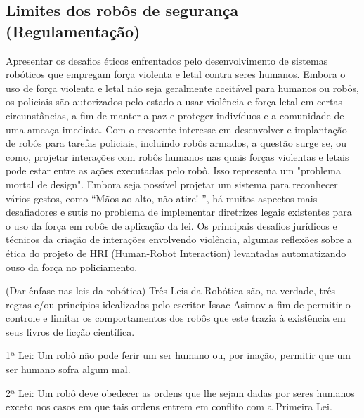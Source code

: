 \documentclass[12pt,a4paper]{article}
\begin{document}

    \subsection{Limites dos robôs de segurança (Regulamentação)}
    Apresentar os desafios éticos enfrentados pelo desenvolvimento de sistemas robóticos que empregam força violenta e letal contra seres humanos. Embora o uso de força violenta e letal não seja geralmente aceitável para humanos ou robôs, os policiais são autorizados pelo estado a usar violência e força letal em certas circunstâncias, a fim de manter a paz e proteger indivíduos e a comunidade de uma ameaça imediata. Com o crescente interesse em desenvolver e implantação de robôs para tarefas policiais, incluindo robôs armados, a questão surge se, ou como, projetar interações com robôs humanos nas quais forças violentas e letais pode estar entre as ações executadas pelo robô. Isso representa um "problema mortal de design". Embora seja possível projetar um sistema para reconhecer vários gestos, como “Mãos ao alto, não atire! ”, há muitos aspectos mais desafiadores e sutis no problema de implementar diretrizes legais existentes para o uso da força em robôs de aplicação da lei. Os principais desafios jurídicos e técnicos da criação de interações envolvendo violência, algumas reflexões sobre a ética do projeto de HRI (Human-Robot Interaction) levantadas automatizando ouso da força no policiamento.  

    (Dar ênfase nas leis da robótica)
    Três Leis da Robótica são, na verdade, três regras e/ou princípios idealizados pelo escritor Isaac Asimov a fim de permitir o controle e limitar os comportamentos dos robôs que este trazia à existência em seus livros de ficção científica.

    1ª Lei: Um robô não pode ferir um ser humano ou, por inação, permitir que um ser humano sofra algum mal.

    2ª Lei: Um robô deve obedecer as ordens que lhe sejam dadas por seres humanos exceto nos casos em que tais ordens entrem em conflito com a Primeira Lei.
\end{document}
